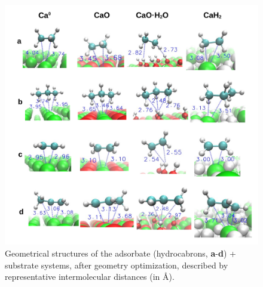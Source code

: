 \documentclass[%
aip,
amsmath,amssymb,
preprint,%
jcp,
showkeys,
]{revtex4-2}
\begin{document}
\begin{figure}[!b]
	\centering
	\includegraphics[width=\linewidth]{Figure8}
	\caption{Geometrical structures of the adsorbate (hydrocabrons, \textbf{a}-\textbf{d}) + substrate systems, after geometry optimization, described by representative intermolecular distances (in \si{\angstrom}).}
	\label{fig:distsad}
\end{figure}
\end{document}
